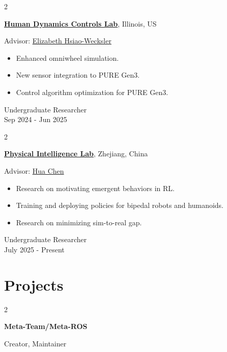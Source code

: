 \documentclass[10pt, letterpaper]{article}
\newenvironment{highlights}{
    \begin{itemize}[
        topsep=0.10 cm,
        parsep=0.10 cm,
        partopsep=0pt,
        itemsep=0pt,
        leftmargin=0 cm + 10pt
    ]
}{
    \end{itemize}
} %
\newenvironment{twocolentry}[2][]{
    \onecolentry
    \def\secondColumn{#2}
    \setcolumnwidth{\fill, 4.5 cm}
    \begin{paracol}{2}
}{
    \switchcolumn \raggedleft \secondColumn
    \end{paracol}
    \endonecolentry
} %
\begin{document}
        \begin{twocolentry} {
            Undergraduate Researcher \\
            Sep 2024 - Jun 2025
        }
            \href{https://hdcl.mechanical.illinois.edu}{\textbf{Human Dynamics Controls Lab}}, Illinois, US

            \vspace{0.10 cm}

            Advisor: \href{https://bioengineering.illinois.edu/people/ethw}{Elizabeth Hsiao-Wecksler} 
            \begin{highlights}
                \item Enhanced omniwheel simulation.
                \item New sensor integration to PURE Gen3.
                \item Control algorithm optimization for PURE Gen3.
            \end{highlights}
        \end{twocolentry}
        
        \vspace{0.2 cm}

        \begin{twocolentry} {
            Undergraduate Researcher \\
            July 2025 - Present
        }
            \href{https://physicalintelligence-lab.github.io/}{\textbf{Physical Intelligence Lab}}, Zhejiang, China

            \vspace{0.10 cm}

            Advisor: \href{https://zjui.intl.zju.edu.cn/en/team/teacherinfo/2461}{Hua Chen} 
            \begin{highlights}
                \item Research on motivating emergent behaviors in RL.
                \item Training and deploying policies for bipedal robots and humanoids.
                \item Research on minimizing sim-to-real gap.
            \end{highlights}
        \end{twocolentry}

    
    \section{Projects}
        
        \begin{twocolentry}{
            Creator, Maintainer
        }
            \textbf{Meta-Team/Meta-ROS}
        \end{twocolentry}
\end{document}
